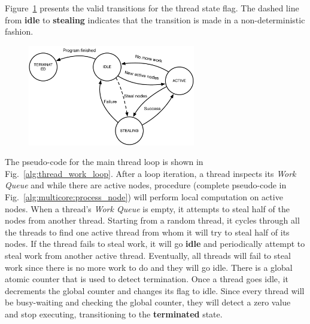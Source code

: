 Figure~\ref{fig:implementation:thread_states} presents the valid transitions for
the thread state flag. The dashed line from \textbf{idle} to \textbf{stealing}
indicates that the transition is made in a non-deterministic fashion.

\begin{figure}[ht]
   \centering
   \includegraphics[width=0.65\textwidth]{figures/implementation/thread_states.pdf}
   \label{fig:implementation:thread_states}
\end{figure}

The pseudo-code for the main thread loop is shown in
Fig.~\ref{alg:thread_work_loop}. After a loop iteration, a thread inspects its
\emph{Work Queue} and while there are active nodes, procedure
 (complete pseudo-code in
Fig.~\ref{alg:multicore:process_node}) will perform local computation on active
nodes. When a thread's \emph{Work Queue} is empty, it attempts to steal half of
the nodes from another thread. Starting from a random thread, it cycles through
all the threads to find one active thread from whom it will try to steal half of
its nodes. If the thread fails to steal work, it will go \textbf{idle} and
periodically attempt to steal work from another active thread. Eventually, all
threads will fail to steal work since there is no more work to do and they will
go idle.  There is a global atomic counter that is used to detect termination.
Once a thread goes idle, it decrements the global counter and changes its flag
to idle.  Since every thread will be busy-waiting and checking the global
counter, they will detect a zero value and stop executing, transitioning to the
\textbf{terminated} state.

